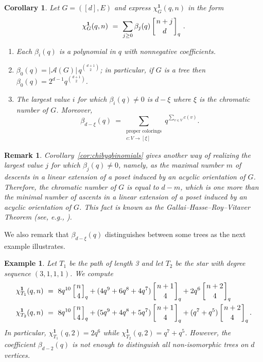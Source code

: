 \documentclass[11pt]{amsart}
\newtheorem{corollary}[theorem]{Corollary}
\newtheorem{exam}{Example}
\newenvironment{example}{\begin{exam}\sf}{\end{exam}}
\newtheorem{rem}{Remark}
\newenvironment{remark}{\begin{rem}\sf}{\end{rem}}
\newcommand\bone{\mathbf{1}}
\begin{document}
\begin{corollary}
Let $G=([d],E)$ and express $\chi^\bone_G(q,n)$ in the form
\[
\chi^\bone_G(q,n) \ = \ \sum_{j\geq0} \beta_j(q) \left[ n+j \atop d \right]_q \, .
\]
\begin{enumerate}[itemsep=1ex]
\item Each $\beta_i(q)$ is a polynomial in $q$ with nonnegative coefficients.
\item $\beta_0(q)=|\mathcal{A}(G)| \, q^{\binom{d+1}{2}}$; in particular, if $G$ is a tree then $\beta_0(q)=2^{d-1} q^{\binom{d+1}{2}}$.
\item The largest value $i$ for which $\beta_i(q)\neq0$ is $d-\xi$ where $\xi$ is the chromatic number of $G$. 
Moreover, 
\[
\beta_{d-\xi}(q) \ =\sum_{\substack{\text{proper colorings}\\ c:V\to [\xi]}} q ^{\sum_{v\in V}c(v)}.
\]
\end{enumerate}
\end{corollary} 

\begin{remark}
Corollary~\ref{cor:chibyqbinomials} gives another way of realizing the largest value $j$ for which $\beta_j(q)\neq0$, namely, as the maximal number $m$ of descents in a linear extension of a poset induced by an acyclic orientation of $G$. 
Therefore, the chromatic number of $G$ is equal to $d-m$, which is one more than the minimal number of ascents in a linear extension of a poset induced by an acyclic orientation of $G$. 
This fact is known as the
Gallai--Hasse--Roy--Vitaver Theorem (see, e.g., \cite[Theorem~7.17]{chartrandzhang}).
\end{remark}

We also remark that $\beta_{d-\xi}(q)$ distinguishes between some trees as the next example illustrates.
 
\begin{example}
Let $T_1$ be the path of length 3 and let $T_2$ be the star with degree sequence $(3,1,1,1)$. 
We compute
\begin{align*}
\chi^\bone_{T_1}(q,n) \ &= \ 8q^{10}\left[{n \atop 4}\right]_q+(4q^{9}+6q^8+4q^7)\left[{n+1 \atop 4}\right]_q+2q^6\left[{n+2 \atop 4}\right]_q \\
\chi^\bone_{T_2}(q,n) \ &= \ 8q^{10}\left[{n \atop 4}\right]_q+(5q^9+4q^8+5q^7)\left[{n+1 \atop 4}\right]_q+(q^7+q^5)\left[{n+2 \atop 4}\right]_q.
\end{align*}
In particular, $\chi^\bone_{T_1}(q,2)=2q^6$ while $\chi^\bone_{T_2}(q,2)=q^7+q^5$. 
However, the coefficient $\beta_{d-2}(q)$ is not enough to distinguish all non-isomorphic trees on $d$ vertices.
\end{example}
\end{document}

